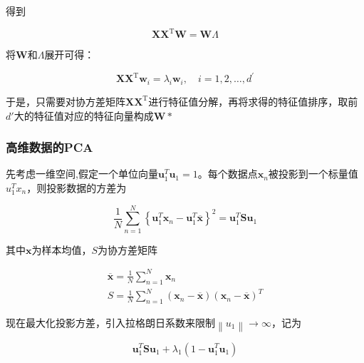\documentclass[UTF8]{ctexart}
\numberwithin{equation}{section}
\begin{document}
	得到
	
	\begin{equation}
		\mathbf{X X}^{\mathrm{T}} \mathbf{W}=\mathbf{W} \Lambda\tag{6}
	\end{equation}
	
	将$\mathbf{W}$和$\Lambda$展开可得：
	
	\begin{equation}
	\mathbf{X} \mathbf{X}^{\mathrm{T}} \boldsymbol{w}_{i}=\lambda_{i} \boldsymbol{w}_{i}, \quad i=1,2, \ldots, d^{\prime}\tag{7}
	\end{equation}
	
	于是，只需要对协方差矩阵$\mathbf{X} \mathbf{X}^{\mathrm{T}}$进行特征值分解，再将求得的特征值排序，取前$d'$大的特征值对应的特征向量构成$\mathbf{W}*$
	
	\subsubsection{高维数据的PCA}
	
	先考虑一维空间,假定一个单位向量$\boldsymbol{u}_{1}^{T} \boldsymbol{u}_{1}=1$。每个数据点$\boldsymbol{x}_{n}$被投影到一个标量值$u_{1}^{T} x_{n}$，则投影数据的方差为
	
	\begin{equation}
	\frac{1}{N} \sum_{n=1}^{N}\left\{\boldsymbol{u}_{1}^{T} \boldsymbol{x}_{n}-\boldsymbol{u}_{1}^{T} \overline{\boldsymbol{x}}\right\}^{2}=\boldsymbol{u}_{1}^{T} \boldsymbol{S} \boldsymbol{u}_{1}\tag{8}
	\end{equation}
	
	其中$\boldsymbol{x}$为样本均值，$S$为协方差矩阵
	
	\begin{equation}
	\begin{array}{c}{\overline{\boldsymbol{x}}=\frac{1}{N} \sum_{n=1}^{N} \boldsymbol{x}_{n}} \\ S=\frac{1}{N} \sum_{n=1}^{N}\left(\boldsymbol{x}_{n}-\overline{\boldsymbol{x}}\right)\left(\boldsymbol{x}_{n}-\overline{\boldsymbol{x}}\right)^{T}\end{array}\tag{9}
	\end{equation}
	
	现在最大化投影方差，引入拉格朗日系数来限制$\left\|u_{1}\right\| \rightarrow \infty$，记为
	
	\begin{equation}
	\boldsymbol{u}_{1}^{T} \boldsymbol{S u}_{1}+\lambda_{1}\left(1-\boldsymbol{u}_{1}^{T} \boldsymbol{u}_{1}\right)\tag{10}
	\end{equation}
	
\end{document}

